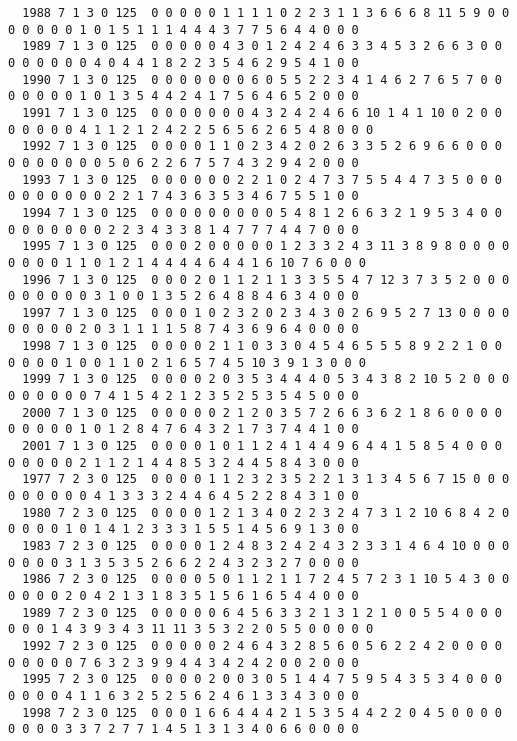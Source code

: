 \begin{landscape}
{\begin{verbatim}
  1988 7 1 3 0 125  0 0 0 0 0 1 1 1 1 0 2 2 3 1 1 3 6 6 6 8 11 5 9 0 0 0 0 0 0 0 1 0 1 5 1 1 1 4 4 4 3 7 7 5 6 4 4 0 0 0
  1989 7 1 3 0 125  0 0 0 0 0 4 3 0 1 2 4 2 4 6 3 3 4 5 3 2 6 6 3 0 0 0 0 0 0 0 0 4 0 4 4 1 8 2 2 3 5 4 6 2 9 5 4 1 0 0
  1990 7 1 3 0 125  0 0 0 0 0 0 0 6 0 5 5 2 2 3 4 1 4 6 2 7 6 5 7 0 0 0 0 0 0 0 1 0 1 3 5 4 4 2 4 1 7 5 6 4 6 5 2 0 0 0
  1991 7 1 3 0 125  0 0 0 0 0 0 0 4 3 2 4 2 4 6 6 10 1 4 1 10 0 2 0 0 0 0 0 0 0 4 1 1 2 1 2 4 2 2 5 6 5 6 2 6 5 4 8 0 0 0
  1992 7 1 3 0 125  0 0 0 0 1 1 0 2 3 4 2 0 2 6 3 3 5 2 6 9 6 6 0 0 0 0 0 0 0 0 0 0 5 0 6 2 2 6 7 5 7 4 3 2 9 4 2 0 0 0
  1993 7 1 3 0 125  0 0 0 0 0 0 2 2 1 0 2 4 7 3 7 5 5 4 4 7 3 5 0 0 0 0 0 0 0 0 0 0 2 2 1 7 4 3 6 3 5 3 4 6 7 5 5 1 0 0
  1994 7 1 3 0 125  0 0 0 0 0 0 0 0 0 5 4 8 1 2 6 6 3 2 1 9 5 3 4 0 0 0 0 0 0 0 0 0 2 2 3 4 3 3 8 1 4 7 7 7 4 4 7 0 0 0
  1995 7 1 3 0 125  0 0 0 2 0 0 0 0 0 1 2 3 3 2 4 3 11 3 8 9 8 0 0 0 0 0 0 0 0 1 1 0 1 2 1 4 4 4 4 6 4 4 1 6 10 7 6 0 0 0
  1996 7 1 3 0 125  0 0 0 2 0 1 1 2 1 1 3 3 5 5 4 7 12 3 7 3 5 2 0 0 0 0 0 0 0 0 0 3 1 0 0 1 3 5 2 6 4 8 8 4 6 3 4 0 0 0
  1997 7 1 3 0 125  0 0 0 1 0 2 3 2 0 2 3 4 3 0 2 6 9 5 2 7 13 0 0 0 0 0 0 0 0 0 2 0 3 1 1 1 1 5 8 7 4 3 6 9 6 4 0 0 0 0
  1998 7 1 3 0 125  0 0 0 0 2 1 1 0 3 3 0 4 5 4 6 5 5 5 8 9 2 2 1 0 0 0 0 0 0 1 0 0 1 1 0 2 1 6 5 7 4 5 10 3 9 1 3 0 0 0
  1999 7 1 3 0 125  0 0 0 0 2 0 3 5 3 4 4 4 0 5 3 4 3 8 2 10 5 2 0 0 0 0 0 0 0 0 0 7 4 1 5 4 2 1 2 3 5 2 5 3 5 4 5 0 0 0
  2000 7 1 3 0 125  0 0 0 0 0 2 1 2 0 3 5 7 2 6 6 3 6 2 1 8 6 0 0 0 0 0 0 0 0 0 1 0 1 2 8 4 7 6 4 3 2 1 7 3 7 4 4 1 0 0
  2001 7 1 3 0 125  0 0 0 0 1 0 1 1 2 4 1 4 4 9 6 4 4 1 5 8 5 4 0 0 0 0 0 0 0 0 2 1 1 2 1 4 4 8 5 3 2 4 4 5 8 4 3 0 0 0
  1977 7 2 3 0 125  0 0 0 0 1 1 2 3 2 3 5 2 2 1 3 1 3 4 5 6 7 15 0 0 0 0 0 0 0 0 0 4 1 3 3 3 2 4 4 6 4 5 2 2 8 4 3 1 0 0
  1980 7 2 3 0 125  0 0 0 0 1 2 1 3 4 0 2 2 3 2 4 7 3 1 2 10 6 8 4 2 0 0 0 0 0 1 0 1 4 1 2 3 3 3 1 5 5 1 4 5 6 9 1 3 0 0
  1983 7 2 3 0 125  0 0 0 0 1 2 4 8 3 2 4 2 4 3 2 3 3 1 4 6 4 10 0 0 0 0 0 0 0 3 1 3 5 3 5 2 6 6 2 2 4 3 2 3 2 7 0 0 0 0
  1986 7 2 3 0 125  0 0 0 0 5 0 1 1 2 1 1 7 2 4 5 7 2 3 1 10 5 4 3 0 0 0 0 0 0 2 0 4 2 1 3 1 8 3 5 1 5 6 1 6 5 4 4 0 0 0
  1989 7 2 3 0 125  0 0 0 0 0 6 4 5 6 3 3 2 1 3 1 2 1 0 0 5 5 4 0 0 0 0 0 0 1 4 3 9 3 4 3 11 11 3 5 3 2 2 0 5 5 0 0 0 0 0
  1992 7 2 3 0 125  0 0 0 0 0 2 4 6 4 3 2 8 5 6 0 5 6 2 2 4 2 0 0 0 0 0 0 0 0 0 7 6 3 2 3 9 9 4 4 3 4 2 4 2 0 0 2 0 0 0
  1995 7 2 3 0 125  0 0 0 0 2 0 0 3 0 5 1 4 4 7 5 9 5 4 3 5 3 4 0 0 0 0 0 0 0 4 1 1 6 3 2 5 2 5 6 2 4 6 1 3 3 4 3 0 0 0
  1998 7 2 3 0 125  0 0 0 1 6 6 4 4 4 2 1 5 3 5 4 4 2 2 0 4 5 0 0 0 0 0 0 0 0 3 3 7 2 7 7 1 4 5 1 3 1 3 4 0 6 6 0 0 0 0

\end{verbatim}}
\end{landscape}

